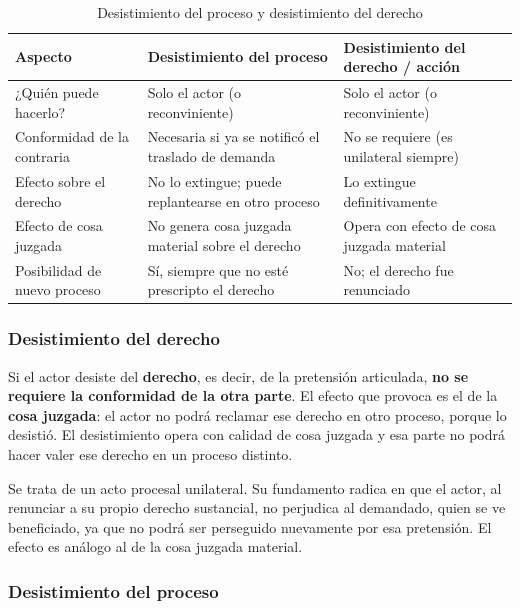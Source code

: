 \documentclass[12pt,oneside]{book}
\begin{document}
\begin{table}[H]
\centering
\caption{Desistimiento del proceso y desistimiento del derecho}
\small
\begin{tabularx}{\textwidth}{
    >{\raggedright\arraybackslash}p{}
    >{\raggedright\arraybackslash}X
    >{\raggedright\arraybackslash}X
}
\toprule
\textbf{Aspecto} & \textbf{Desistimiento del proceso} & \textbf{Desistimiento del derecho / acción} \\
\midrule
¿Quién puede hacerlo? & Solo el actor (o reconviniente) & Solo el actor (o reconviniente) \\
Conformidad de la contraria & Necesaria si ya se notificó el traslado de demanda & No se requiere (es unilateral siempre) \\
Efecto sobre el derecho & No lo extingue; puede replantearse en otro proceso & Lo extingue definitivamente \\
Efecto de cosa juzgada & No genera cosa juzgada material sobre el derecho & Opera con efecto de cosa juzgada material \\
Posibilidad de nuevo proceso & Sí, siempre que no esté prescripto el derecho & No; el derecho fue renunciado \\
\bottomrule
\end{tabularx}
\end{table}

\subsubsection{Desistimiento del derecho}

Si el actor desiste del \textbf{derecho}, es decir, de la pretensión articulada, \textbf{no se requiere la conformidad de la otra parte}. El efecto que provoca es el de la \textbf{cosa juzgada}: el actor no podrá reclamar ese derecho en otro proceso, porque lo desistió. El desistimiento opera con calidad de cosa juzgada y esa parte no podrá hacer valer ese derecho en un proceso distinto.

Se trata de un acto procesal unilateral. Su fundamento radica en que el actor, al renunciar a su propio derecho sustancial, no perjudica al demandado, quien se ve beneficiado, ya que no podrá ser perseguido nuevamente por esa pretensión. El efecto es análogo al de la cosa juzgada material.

\subsubsection{Desistimiento del proceso}
\end{document}
